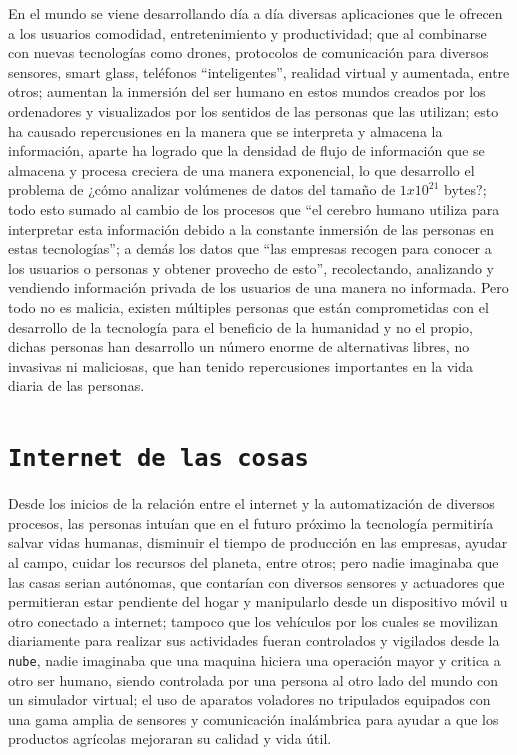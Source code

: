 \documentclass[jou]{apa6} %
\begin{document}
En el mundo se viene desarrollando día a día diversas aplicaciones que le ofrecen a los usuarios comodidad, entretenimiento y productividad; que al combinarse con nuevas tecnologías como drones, protocolos de comunicación para diversos sensores, smart glass, teléfonos “inteligentes”, realidad virtual y aumentada, entre otros; aumentan la inmersión del ser humano en estos mundos creados por los ordenadores y visualizados por los sentidos de las personas que las utilizan; esto ha causado repercusiones en la manera que se interpreta y almacena la información, aparte ha logrado que la densidad de flujo de información que se almacena y procesa creciera de una manera exponencial, lo que desarrollo  el problema de ¿cómo analizar volúmenes de datos del tamaño de $1 x10^{21}$ bytes?; todo esto sumado al cambio de \cite{carr2011superficiales} los procesos que ``el cerebro humano utiliza para interpretar esta información debido a la constante inmersión de las personas en estas tecnologías''; a demás los datos \cite{perez2016peligros} que ``las empresas recogen para conocer a los usuarios o personas y obtener provecho de esto'', recolectando, analizando y vendiendo información privada de los usuarios de una manera no informada. Pero todo no es malicia, existen múltiples personas que están comprometidas con el desarrollo de la tecnología para el beneficio de la humanidad y no el propio, dichas personas han desarrollo un número enorme de alternativas libres, no invasivas ni maliciosas, que han tenido repercusiones importantes en la vida diaria de las personas.

\section{\texttt{Internet de las cosas}}

Desde los inicios de la relación entre el internet y la automatización de diversos procesos, las personas intuían que en el futuro próximo la tecnología permitiría salvar vidas humanas, disminuir el tiempo de producción en las empresas, ayudar al campo, cuidar los recursos del planeta, entre otros; pero nadie imaginaba que las casas serian autónomas, que contarían con diversos sensores y actuadores que permitieran estar pendiente del hogar y manipularlo desde un dispositivo móvil u otro conectado a internet; tampoco que los vehículos por los cuales se movilizan diariamente para realizar sus actividades fueran controlados y vigilados desde la \texttt{nube}, nadie imaginaba que una maquina hiciera una operación mayor y critica a otro ser humano, siendo controlada por una persona al otro lado del mundo con un simulador virtual; el uso de aparatos voladores no tripulados equipados con una gama amplia de sensores y comunicación inalámbrica para ayudar a que los productos agrícolas mejoraran su calidad y vida útil.
\end{document}
